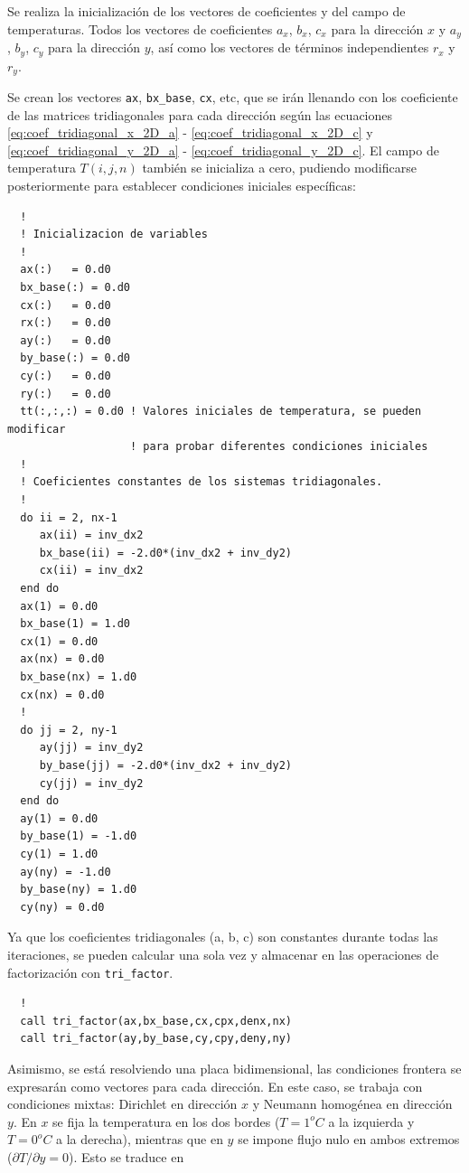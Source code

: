 \documentclass[11pt,a4paper]{article}
\begin{document}
Se realiza la inicializaci\'on de los vectores de coeficientes y del campo de 
temperaturas. Todos los vectores de coeficientes $a_x$, $b_x$, $c_x$ para la 
direcci\'on $x$ y $a_y$, $b_y$, $c_y$ para la direcci\'on $y$, así como los 
vectores de t\'erminos independientes $r_x$ y $r_y$. 

\medskip

Se crean los vectores \texttt{ax}, \texttt{bx\_base}, \texttt{cx}, etc, que 
se ir\'an llenando con los coeficiente de las matrices tridiagonales para cada 
direcci\'on seg\'un las ecuaciones \ref{eq:coef_tridiagonal_x_2D_a} - 
\ref{eq:coef_tridiagonal_x_2D_c} y \ref{eq:coef_tridiagonal_y_2D_a} - 
\ref{eq:coef_tridiagonal_y_2D_c}. El campo de temperatura $T(i,j,n)$ también se inicializa a cero, pudiendo 
modificarse posteriormente para establecer condiciones iniciales espec\'ificas:

\begin{verbatim}
  !
  ! Inicializacion de variables
  !
  ax(:)   = 0.d0
  bx_base(:) = 0.d0
  cx(:)   = 0.d0
  rx(:)   = 0.d0
  ay(:)   = 0.d0
  by_base(:) = 0.d0
  cy(:)   = 0.d0
  ry(:)   = 0.d0
  tt(:,:,:) = 0.d0 ! Valores iniciales de temperatura, se pueden modificar 
                   ! para probar diferentes condiciones iniciales
  !
  ! Coeficientes constantes de los sistemas tridiagonales.
  !
  do ii = 2, nx-1
     ax(ii) = inv_dx2
     bx_base(ii) = -2.d0*(inv_dx2 + inv_dy2)
     cx(ii) = inv_dx2
  end do
  ax(1) = 0.d0
  bx_base(1) = 1.d0
  cx(1) = 0.d0
  ax(nx) = 0.d0
  bx_base(nx) = 1.d0
  cx(nx) = 0.d0
  !
  do jj = 2, ny-1
     ay(jj) = inv_dy2
     by_base(jj) = -2.d0*(inv_dx2 + inv_dy2)
     cy(jj) = inv_dy2
  end do
  ay(1) = 0.d0
  by_base(1) = -1.d0
  cy(1) = 1.d0
  ay(ny) = -1.d0
  by_base(ny) = 1.d0
  cy(ny) = 0.d0
\end{verbatim}

Ya que los coeficientes tridiagonales (a, b, c) son constantes durante todas las
iteraciones, se pueden calcular una sola vez y almacenar en las operaciones de 
factorizaci\'on con \texttt{tri\_factor}.

\begin{verbatim}
  !
  call tri_factor(ax,bx_base,cx,cpx,denx,nx)
  call tri_factor(ay,by_base,cy,cpy,deny,ny)
\end{verbatim}

Asimismo, se est\'a resolviendo una placa bidimensional, las condiciones 
frontera se expresar\'an como vectores para cada direcci\'on. 
En este caso, se trabaja con condiciones mixtas: Dirichlet en direcci\'on $x$
y Neumann homog\'enea en direcci\'on $y$. En $x$ se fija la temperatura en los
dos bordes ($T=1^{o}C$ a la izquierda y $T=0^{o}C$ a la derecha), mientras que en $y$
se impone flujo nulo en ambos extremos ($\partial T/\partial y = 0$). Esto se
traduce en 
\end{document}
